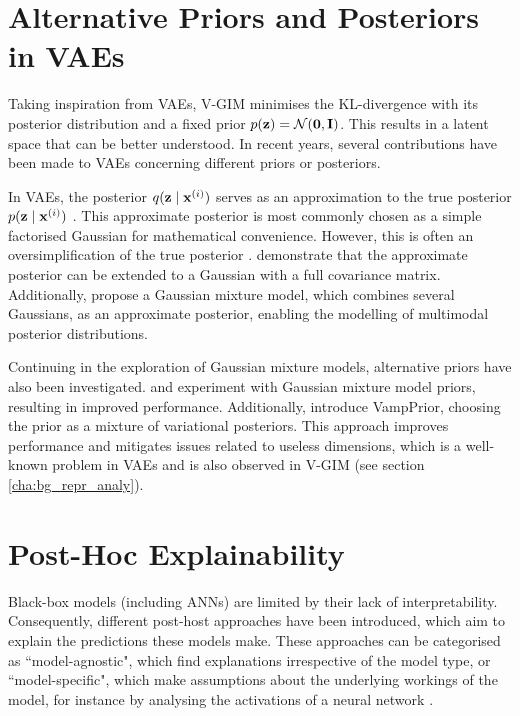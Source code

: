 	

\section{Alternative Priors and Posteriors in VAEs} \label{cha:rel_alt_priors}
	Taking inspiration from VAEs, V-GIM minimises the KL-divergence with its posterior distribution and a fixed prior $p(\mathbf{z})=\mathcal{N}(\bm{\mathbf{0}}, \mathbf{I})$. This results in a latent space that can be better understood. In recent years, several contributions have been made to VAEs concerning different priors or posteriors.
	
	In VAEs, the posterior $q (\mathbf{z} \mid \mathbf{x}^{(i)})$ serves as an approximation to the true posterior $p (\mathbf{z} \mid \mathbf{x}^{(i)})$ \citep{odaiboTutorialDerivingStandard2019}. This approximate posterior is most commonly chosen as a simple factorised Gaussian for mathematical convenience. However, this is often an oversimplification of the true posterior \citep{nalisnickApproximateInferenceDeep2016}. \cite{kingmaIntroductionVariationalAutoencoders2019} demonstrate that the approximate posterior can be extended to a Gaussian with a full covariance matrix. Additionally, \cite{nalisnickApproximateInferenceDeep2016} propose a Gaussian mixture model, which combines several Gaussians, as an approximate posterior, enabling the modelling of multimodal posterior distributions.
	
	Continuing in the exploration of Gaussian mixture models, alternative priors have also been investigated. \cite{guoVariationalAutoencoderOptimizing2020} and \cite{leeMetaGMVAEMixtureGaussian2021} experiment with Gaussian mixture model priors, resulting in improved performance. Additionally, \cite{tomczakVAEVampPrior2018} introduce VampPrior, choosing the prior as a mixture of variational posteriors. This approach improves performance and mitigates issues related to useless dimensions, which is a well-known problem in VAEs and is also observed in V-GIM (see section \ref{cha:bg_repr_analy}).
	

\section{Post-Hoc Explainability}
Black-box models (including ANNs) are limited by their lack of interpretability. Consequently, different post-host approaches have been introduced, which aim to explain the predictions these models make. These approaches can be categorised as ``model-agnostic", which find explanations irrespective of the model type, or ``model-specific", which make assumptions about the underlying workings of the model, for instance by analysing the activations of a neural network \cite{barredoarrietaExplainableArtificialIntelligence2020a}.

